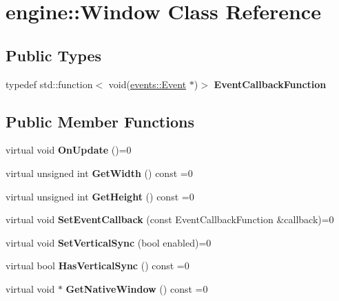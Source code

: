 \hypertarget{classengine_1_1Window}{}\section{engine\+:\+:Window Class Reference}
\label{classengine_1_1Window}
\subsection*{Public Types}
\begin{DoxyCompactItemize}
\item 
\mbox{\label{classengine_1_1Window_accae77cf11b87e90027b03c4fb9afe80}} 
typedef std\+::function$<$ void(\hyperlink{classengine_1_1events_1_1Event}{events\+::\+Event} $\ast$)$>$ {\bfseries Event\+Callback\+Function}
\end{DoxyCompactItemize}
\subsection*{Public Member Functions}
\begin{DoxyCompactItemize}
\item 
\mbox{\label{classengine_1_1Window_acbe42756a4062951c06a3d52970ffc70}} 
virtual void {\bfseries On\+Update} ()=0
\item 
\mbox{\label{classengine_1_1Window_ab98eea2d4d31b19af72c452d932f51e7}} 
virtual unsigned int {\bfseries Get\+Width} () const =0
\item 
\mbox{\label{classengine_1_1Window_aaa222cfbb6047cf6bf0337a94f5bdab0}} 
virtual unsigned int {\bfseries Get\+Height} () const =0
\item 
\mbox{\label{classengine_1_1Window_a7c66a5afd9dbfcc99782847c71826eac}} 
virtual void {\bfseries Set\+Event\+Callback} (const Event\+Callback\+Function \&callback)=0
\item 
\mbox{\label{classengine_1_1Window_a671eb924c7114d991ed24f0e24325517}} 
virtual void {\bfseries Set\+Vertical\+Sync} (bool enabled)=0
\item 
\mbox{\label{classengine_1_1Window_a62914a8d91d0c1891a3168a61e5a59ba}} 
virtual bool {\bfseries Has\+Vertical\+Sync} () const =0
\item 
\mbox{\label{classengine_1_1Window_aa13831c03659b38bd405371b409c13d0}} 
virtual void $\ast$ {\bfseries Get\+Native\+Window} () const =0
\end{DoxyCompactItemize}
